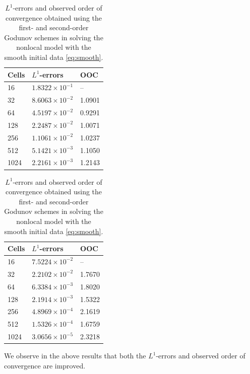 \begin{table}[H]
    \centering
    \begin{minipage}{0.45\textwidth}
        \centering
        \begin{tabular}{ |p{1.5cm}||p{2.2cm}| |p{1.5cm}| }
            \hline
            \textbf{Cells } & $L^{1}$-\textbf{errors} & \textbf{OOC} \\
            \hline
            16              & $1.8322 \times 10^{-1}$ & --           \\
            32              & $8.6063 \times 10^{-2}$ & 1.0901       \\
            64              & $4.5197 \times 10^{-2}$ & 0.9291       \\
            128             & $2.2487 \times 10^{-2}$ & 1.0071       \\
            256             & $1.1061 \times 10^{-2}$ & 1.0237       \\
            512             & $5.1421 \times 10^{-3}$ & 1.1050       \\
            1024            & $2.2161 \times 10^{-3}$ & 1.2143       \\
            \hline
        \end{tabular}
        \caption*{(a) First-order Godunov scheme}
    \end{minipage}
    \hfill
    \begin{minipage}{0.5\textwidth}
        \centering
        \begin{tabular}{ |p{1.5cm}||p{2.2cm}| |p{1.5cm}| }
            \hline
            \textbf{Cells } & $L^{1}$-\textbf{errors}  & \textbf{OOC} \\
            \hline
            16              & $7.5224 \times 10^{-2}$  & --           \\
            32              & $2.2102 \times 10^{-2}$  & 1.7670       \\
            64              & $6.3384 \times 10^{-3} $ & 1.8020       \\
            128             & $2.1914 \times 10^{-3}$  & 1.5322       \\
            256             & $4.8969 \times 10^{-4}$  & 2.1619       \\
            512             & $1.5326 \times 10^{-4}$  & 1.6759       \\
            1024            & $3.0656 \times 10^{-5}$  & 2.3218       \\
            \hline
        \end{tabular}
        \caption*{(b) Second-order Godunov scheme}
    \end{minipage}

    \caption{$L^{1}$-errors and observed order of convergence obtained using the first- and second-order Godunov schemes in solving the nonlocal model with the smooth initial data \eqref{eq:smooth}.}
    \label{tab:table_9}
\end{table}
We observe in the above results that both the $L^{1}$-errors and observed order of convergence are improved.

